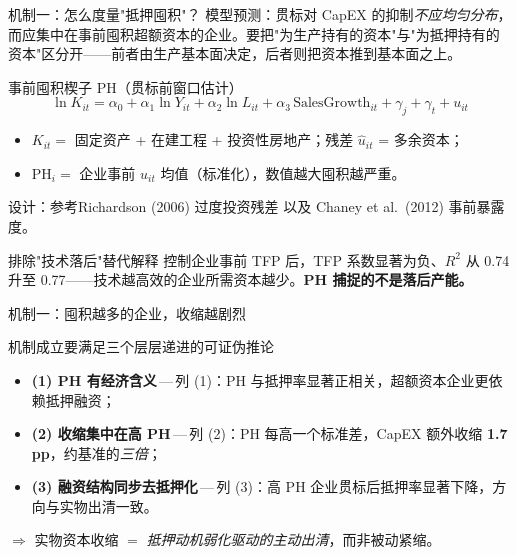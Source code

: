 \begin{frame}{机制一：怎么度量"抵押囤积"？}
  \small
  模型预测：贯标对 CapEX 的抑制\emph{不应均匀分布}，而应集中在事前囤积超额资本的企业。要把"为生产持有的资本"与"为抵押持有的资本"区分开——前者由生产基本面决定，后者则把资本推到基本面之上。

  \begin{methodbox}{事前囤积楔子 PH（贯标前窗口估计）}
    \footnotesize
    \vspace{-0.4em}
    \[
      \ln K_{it}=\alpha_0+\alpha_1\ln Y_{it}+\alpha_2\ln L_{it}
      +\alpha_3\,\text{SalesGrowth}_{it}+\gamma_j+\gamma_t+u_{it}
    \]
    \vspace{-1.1em}
    \begin{itemize}\setlength\itemsep{0pt}
      \item $K_{it}=$ 固定资产 + 在建工程 + 投资性房地产；残差 $\hat u_{it}$ = 多余资本；
      \item $\text{PH}_i=$ 企业事前 $\hat u_{it}$ 均值（标准化），数值越大囤积越严重。
    \end{itemize}
    \vspace{-0.2em}
    {\scriptsize 设计：参考Richardson (2006) 过度投资残差 以及 Chaney et al.\ (2012) 事前暴露度。}
  \end{methodbox}

  \begin{robustbox}{排除"技术落后"替代解释}
    \footnotesize
    控制企业事前 TFP 后，TFP 系数显著为负、$R^2$ 从 0.74 升至 0.77——技术越高效的企业所需资本越少。\textbf{PH 捕捉的不是落后产能。}
  \end{robustbox}
\end{frame}

\begin{frame}{机制一：囤积越多的企业，收缩越剧烈}
  

  \begin{findingbox}{机制成立要满足三个层层递进的可证伪推论}
    \scriptsize
    \begin{itemize}\setlength\itemsep{1pt}
      \item \textbf{(1) PH 有经济含义}\,---\,列 (1)：PH 与抵押率显著正相关，超额资本企业更依赖抵押融资；
      \item \textbf{(2) 收缩集中在高 PH}\,---\,列 (2)：PH 每高一个标准差，CapEX 额外收缩 \textbf{1.7\,pp}，约基准的\emph{三倍}；
      \item \textbf{(3) 融资结构同步去抵押化}\,---\,列 (3)：高 PH 企业贯标后抵押率显著下降，方向与实物出清一致。
    \end{itemize}
    \vspace{-0.2em}
    \centering $\Rightarrow$ 实物资本收缩 $=$ \emph{抵押动机弱化驱动的主动出清}，而非被动紧缩。
  \end{findingbox}
\end{frame}

